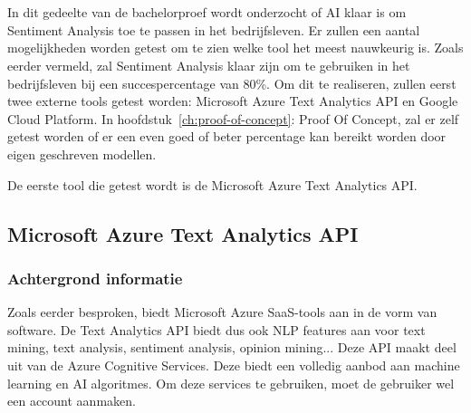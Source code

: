 
\chapter{}
\label{ch:methodologie}


In dit gedeelte van de bachelorproef wordt onderzocht of AI klaar is om Sentiment Analysis toe te passen in het bedrijfsleven. Er zullen een aantal mogelijkheden worden getest om te zien welke tool het meest nauwkeurig is. Zoals eerder vermeld, zal Sentiment Analysis klaar zijn om te gebruiken in het bedrijfsleven bij een succespercentage van 80\%. Om dit te realiseren, zullen eerst twee externe tools getest worden: Microsoft Azure Text Analytics API en Google Cloud Platform. In hoofdstuk~\ref{ch:proof-of-concept}: Proof Of Concept, zal er zelf getest worden of er een even goed of beter percentage kan bereikt worden door eigen geschreven modellen.

De eerste tool die getest wordt is de Microsoft Azure Text Analytics API. 

\section{Microsoft Azure Text Analytics API}

\subsection{Achtergrond informatie}
\label{achtergrondinformatieazure}
Zoals eerder besproken, biedt Microsoft Azure SaaS-tools aan in de vorm van software. De Text Analytics API biedt dus ook NLP features aan voor text mining, text analysis, sentiment analysis, opinion mining... \autocite{Microsoft2020} Deze API maakt deel uit van de Azure Cognitive Services. Deze biedt een volledig aanbod aan machine learning en AI algoritmes. Om deze services te gebruiken, moet de gebruiker wel een account aanmaken. \autocite{Microsoft2020}

